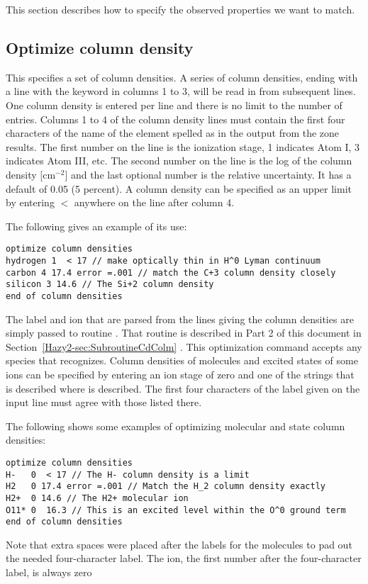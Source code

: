 This section describes how to specify the observed properties we want
to match.

\subsection{Optimize column density}

This specifies a set of column densities.
A series of column densities,
ending with a line with the keyword  in columns 1 to 3,
will be read
in from subsequent lines.
One column density is entered per line and there is no limit to
the number of entries.
Columns 1 to 4 of the column density lines must
contain the first four characters of the name of the element spelled as
in the output from the zone results.
The first number on the line is the
ionization stage, 1 indicates Atom I, 3 indicates Atom III, etc.
The second
number on the line is the log of the column density [cm$^{-2}$]
and the last
optional number is the relative uncertainty.
It has a default of 0.05 (5
percent).
A column density can be specified as an upper limit by entering
$<$ anywhere on the line after column 4.

The following gives an example of its use:
\begin{verbatim}
optimize column densities
hydrogen 1  < 17 // make optically thin in H^0 Lyman continuum
carbon 4 17.4 error =.001 // match the C+3 column density closely
silicon 3 14.6 // The Si+2 column density
end of column densities
\end{verbatim}

The label
and ion that are parsed from the lines giving the column densities
are simply
passed to routine .
That routine is described in Part 2 of this
document in Section~\ref{Hazy2-sec:SubroutineCdColm}
.
This optimization command accepts any species that
 recognizes.
Column densities of molecules and excited states of some ions
can be specified by entering an ion stage of zero and one of the strings
that is described where  is described.
The first four characters
of the label given on the input line must agree with those listed there.

The following shows some examples of optimizing molecular and state column
densities:
\begin{verbatim}
optimize column densities
H-   0  < 17 // The H- column density is a limit
H2   0 17.4 error =.001 // Match the H_2 column density exactly
H2+  0 14.6 // The H2+ molecular ion
O11* 0  16.3 // This is an excited level within the O^0 ground term
end of column densities
\end{verbatim}
Note that extra spaces were placed after the labels for the molecules to
pad out the needed four-character label.
The ion, the first number after
the four-character label, is always zero

